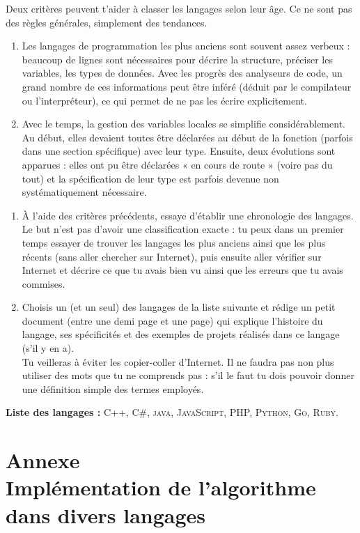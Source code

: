 \documentclass[a4paper,12pt]{book}
\begin{document}
Deux critères peuvent t'aider à classer les langages selon leur \og âge\fg{}. Ce ne sont pas des règles générales, simplement des tendances.
\begin{enumerate}[--]
	\item 	 Les langages de programmation les plus anciens sont souvent assez verbeux : beaucoup de lignes sont nécessaires pour décrire la structure, préciser les variables, les types de données. Avec les progrès des analyseurs de code, un grand nombre de ces informations peut être inféré (déduit par le compilateur ou l'interpréteur), ce qui permet de ne pas les écrire explicitement.
	\item 	Avec le temps, la gestion des variables locales se simplifie considérablement. Au début, elles devaient toutes être déclarées au début de la fonction (parfois dans une section spécifique) avec leur type. Ensuite, deux évolutions sont apparues : elles ont pu être déclarées « en cours de route » (voire pas du tout) et la spécification de leur type est parfois devenue non systématiquement nécessaire.
\end{enumerate}

\begin{enumerate}[\bfseries 1.]
	\item À l'aide des critères précédents, essaye d'établir une chronologie des langages. Le but n'est pas d'avoir une classification exacte : tu peux dans un premier temps essayer de trouver les langages les plus anciens ainsi que les plus récents (sans aller chercher sur Internet), puis ensuite aller vérifier sur Internet et décrire ce que tu avais bien vu ainsi que les erreurs que tu avais commises.
    \item 	Choisis un (et un seul) des langages de la liste suivante et rédige un petit document (entre une demi page et une page) qui explique l'histoire du langage, ses spécificités et des exemples de projets réalisés dans ce langage (s'il y en a).\\
    	Tu veilleras à éviter les \og copier-coller\fg{} d'Internet. Il ne faudra pas non plus utiliser des mots que tu ne comprends pas : s'il le faut tu dois pouvoir donner une définition simple des termes employés.\\
\end{enumerate}
\textbf{Liste des langages :} \textsc{C++, C\#, java, JavaScript, PHP, Python, Go, Ruby}.


\section*{Annexe\\Implémentation de l'algorithme dans divers langages}
\end{document}
